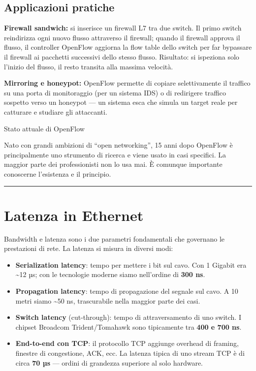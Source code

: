 \documentclass[
  italian,
  openany]{book}
\providecommand{\tightlist}{%
  \setlength{\itemsep}{0pt}\setlength{\parskip}{0pt}}
\begin{document}
\subsection{Applicazioni pratiche}\label{applicazioni-pratiche}

\textbf{Firewall sandwich:} si inserisce un firewall L7 tra due switch.
Il primo switch reindirizza ogni nuovo flusso attraverso il firewall;
quando il firewall approva il flusso, il controller OpenFlow aggiorna la
flow table dello switch per far bypassare il firewall ai pacchetti
successivi dello stesso flusso. Risultato: si ispeziona solo l'inizio
del flusso, il resto transita alla massima velocità.

\textbf{Mirroring e honeypot:} OpenFlow permette di copiare
selettivamente il traffico su una porta di monitoraggio (per un sistema
IDS) o di redirigere traffico sospetto verso un honeypot --- un sistema
esca che simula un target reale per catturare e studiare gli attaccanti.

\begin{calloutnote}{Stato attuale di OpenFlow}

Nato con grandi ambizioni di ``open networking'', 15 anni dopo OpenFlow
è principalmente uno strumento di ricerca e viene usato in casi
specifici. La maggior parte dei professionisti non lo usa mai. È
comunque importante conoscerne l'esistenza e il principio.

\end{calloutnote}

\begin{center}\rule{0.5\linewidth}{0.5pt}\end{center}

\section{Latenza in Ethernet}\label{latenza-in-ethernet}

Bandwidth e latenza sono i due parametri fondamentali che governano le
prestazioni di rete. La latenza si misura in diversi modi:

\begin{itemize}
\tightlist
\item
  \textbf{Serialization latency}: tempo per mettere i bit sul cavo. Con
  1 Gigabit era \textasciitilde12 µs; con le tecnologie moderne siamo
  nell'ordine di \textbf{300 ns}.
\item
  \textbf{Propagation latency}: tempo di propagazione del segnale sul
  cavo. A 10 metri siamo \textasciitilde50 ns, trascurabile nella
  maggior parte dei casi.
\item
  \textbf{Switch latency} (cut-through): tempo di attraversamento di uno
  switch. I chipset Broadcom Trident/Tomahawk sono tipicamente tra
  \textbf{400 e 700 ns}.
\item
  \textbf{End-to-end con TCP}: il protocollo TCP aggiunge overhead di
  framing, finestre di congestione, ACK, ecc. La latenza tipica di uno
  stream TCP è di circa \textbf{70 µs} --- ordini di grandezza superiore
  al solo hardware.
\end{itemize}
\end{document}
